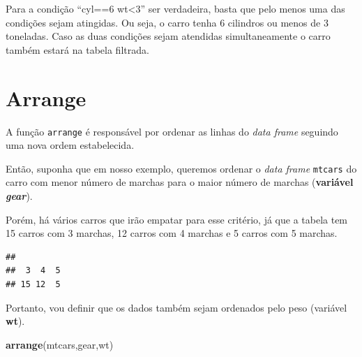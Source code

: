 \documentclass[
]{book}
\newenvironment{Shaded}{\begin{snugshade}}{\end{snugshade}}
\newcommand{\CommentTok}[1]{\textcolor[rgb]{0.56,0.35,0.01}{\textit{#1}}}
\newcommand{\KeywordTok}[1]{\textcolor[rgb]{0.13,0.29,0.53}{\textbf{#1}}}
\newcommand{\NormalTok}[1]{#1}
\newcommand{\OperatorTok}[1]{\textcolor[rgb]{0.81,0.36,0.00}{\textbf{#1}}}
\begin{document}
Para a condição ``cyl==6 \textbar{} wt\textless3'' ser verdadeira, basta
que pelo menos uma das condições sejam atingidas. Ou seja, o carro tenha
6 cilindros ou menos de 3 toneladas. Caso as duas condições sejam
atendidas simultaneamente o carro também estará na tabela filtrada.

\hypertarget{arrange}{%
\section{Arrange}\label{arrange}}

A função \texttt{arrange} é responsável por ordenar as linhas do
\emph{data frame} seguindo uma nova ordem estabelecida.

Então, suponha que em nosso exemplo, queremos ordenar o \emph{data
frame} \texttt{mtcars} do carro com menor número de marchas para o maior
número de marchas (\textbf{variável \emph{gear}}).

Porém, há vários carros que irão empatar para esse critério, já que a
tabela tem 15 carros com 3 marchas, 12 carros com 4 marchas e 5 carros
com 5 marchas.

\begin{Shaded}
\end{Shaded}

\begin{verbatim}
## 
##  3  4  5 
## 15 12  5
\end{verbatim}

Portanto, vou definir que os dados também sejam ordenados pelo peso
(variável \textbf{wt}).

\begin{Shaded}
\begin{Highlighting}[]
\KeywordTok{arrange}\NormalTok{(mtcars,gear,wt)}
\end{Highlighting}
\end{Shaded}
\end{document}
